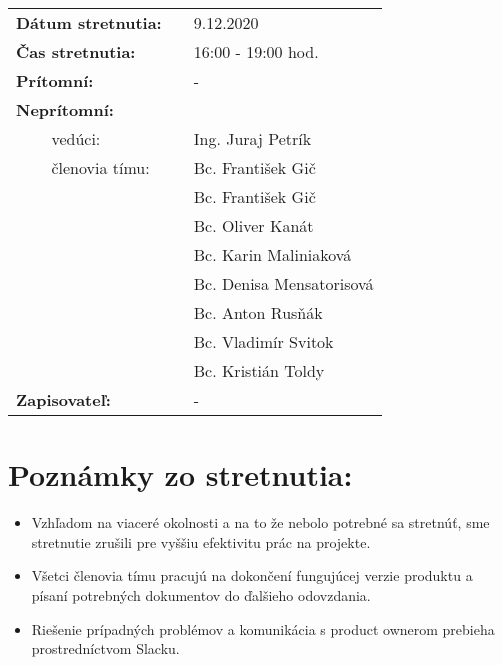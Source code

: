 \documentclass{article}
\begin{document}
    

    \begin{table}[h]
        \begin{tabular}{lllll}
            \multicolumn{3}{l}{\textbf{Dátum stretnutia:}} & & 9.12.2020 \\
            \multicolumn{3}{l}{\textbf{Čas stretnutia:}} & & 16:00 - 19:00 hod. \\
            \multicolumn{3}{l}{\textbf{Prítomní:}} & & -\\
            \multicolumn{3}{l}{\textbf{Neprítomní:}} \\
            & & vedúci: & & Ing. Juraj Petrík \\
            & & členovia tímu: & & Bc. František Gič  \\
            & & & & Bc. František Gič  \\
            & & & & Bc. Oliver Kanát \\
            & & & & Bc. Karin Maliniaková \\
            & & & & Bc. Denisa Mensatorisová \\
            & & & & Bc. Anton Rusňák \\
            & & & & Bc. Vladimír Svitok \\
            & & & & Bc. Kristián Toldy \\
            \multicolumn{3}{l}{\textbf{Zapisovateľ:}} & & -\\
        \end{tabular}
        \label{tab:grades}
    \end{table}

    \section*{Poznámky zo stretnutia:}

    \begin{itemize}
        \item Vzhľadom na viaceré okolnosti a na to že nebolo potrebné sa stretnúť, sme stretnutie zrušili pre vyššiu efektivitu prác na projekte. 
        \item Všetci členovia tímu pracujú na dokončení fungujúcej verzie produktu a písaní potrebných dokumentov do ďalšieho odovzdania.
        \item Riešenie prípadných problémov a komunikácia s product ownerom prebieha prostredníctvom Slacku.
    \end{itemize}    
\end{document}
